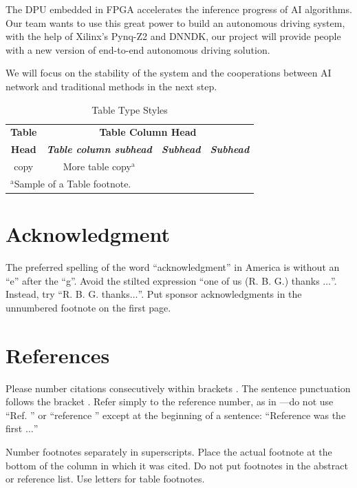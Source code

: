 \documentclass[conference]{IEEEtran}
\begin{document}
The DPU embedded in FPGA accelerates the inference progress of AI algorithms. Our team wants to use this great power to build an autonomous driving system, with the help of Xilinx's Pynq-Z2 and DNNDK, our project will provide people with a new version of end-to-end autonomous driving solution.

We will focus on the stability of the system and the cooperations between AI network and traditional methods in the next step.

\begin{table}[htbp]
\caption{Table Type Styles}
\begin{center}
\begin{tabular}{|c|c|c|c|}
\hline
\textbf{Table}&\multicolumn{3}{|c|}{\textbf{Table Column Head}} \\
\cline{2-4} 
\textbf{Head} & \textbf{\textit{Table column subhead}}& \textbf{\textit{Subhead}}& \textbf{\textit{Subhead}} \\
\hline
copy& More table copy$^{\mathrm{a}}$& &  \\
\hline
\multicolumn{4}{l}{$^{\mathrm{a}}$Sample of a Table footnote.}
\end{tabular}
\label{tab1}
\end{center}
\end{table}

\section*{Acknowledgment}

The preferred spelling of the word ``acknowledgment'' in America is without 
an ``e'' after the ``g''. Avoid the stilted expression ``one of us (R. B. 
G.) thanks $\ldots$''. Instead, try ``R. B. G. thanks$\ldots$''. Put sponsor 
acknowledgments in the unnumbered footnote on the first page.

\section*{References}

Please number citations consecutively within brackets \cite{b1}. The 
sentence punctuation follows the bracket \cite{b2}. Refer simply to the reference 
number, as in \cite{b3}---do not use ``Ref. \cite{b3}'' or ``reference \cite{b3}'' except at 
the beginning of a sentence: ``Reference \cite{b3} was the first $\ldots$''

Number footnotes separately in superscripts. Place the actual footnote at 
the bottom of the column in which it was cited. Do not put footnotes in the 
abstract or reference list. Use letters for table footnotes.
\end{document}
